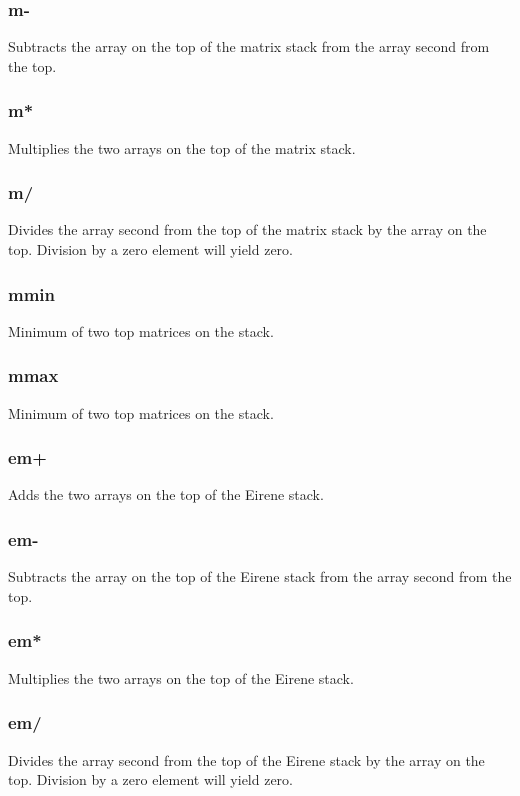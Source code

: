 \documentclass[a4paper,10pt]{report}
\begin{document}
\subsubsection{m-}\label{sec:m-}
Subtracts the array on the top of the matrix stack from the array second from
the top.

\subsubsection{m*}\label{sec:m*}
Multiplies the two arrays on the top of the matrix stack.

\subsubsection{m/}\label{sec:m/}
Divides the array second from the top of the matrix stack by the array on
the top. Division by a zero element will yield zero.

\subsubsection{mmin}\label{sec:mmin}
Minimum of two top matrices on the stack.

\subsubsection{mmax}\label{sec:mmax}
Minimum of two top matrices on the stack.

\subsubsection{em+}\label{sec:em+}
Adds the two arrays on the top of the Eirene stack.

\subsubsection{em-}\label{sec:em-}
Subtracts the array on the top of the Eirene stack from the array second from
the top.

\subsubsection{em*}\label{sec:em*}
Multiplies the two arrays on the top of the Eirene stack.

\subsubsection{em/}\label{sec:em/}
Divides the array second from the top of the Eirene stack by the array on
the top. Division by a zero element will yield zero.
\end{document}
